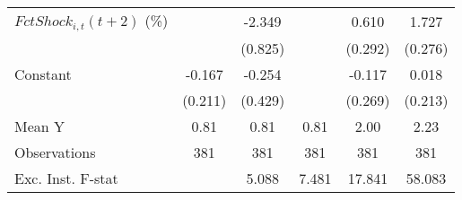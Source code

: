 {\begin{tabular}{l*{5}{c}}
\addlinespace
$ FctShock_{i,t}(t+2)$ (\%)&                     &      -2.349\sym{***}&                     &       0.610\sym{**} &       1.727\sym{***}\\
                    &                     &     (0.825)         &                     &     (0.292)         &     (0.276)         \\
\addlinespace
Constant            &      -0.167         &      -0.254         &                     &      -0.117         &       0.018         \\
                    &     (0.211)         &     (0.429)         &                     &     (0.269)         &     (0.213)         \\
\midrule
Mean Y              &        0.81         &        0.81         &        0.81         &        2.00         &        2.23         \\
Observations        &         381         &         381         &         381         &         381         &         381         \\
Exc. Inst. F-stat   &                     &       5.088         &       7.481         &      17.841         &      58.083         \\
\bottomrule
\end{tabular}
}
